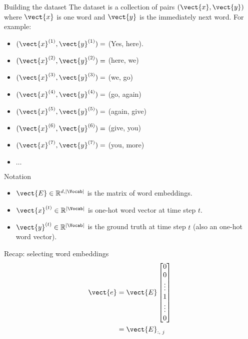 \documentclass[10pt]{beamer}
\begin{document}
\begin{frame}{Building the dataset}
The dataset is a collection of pairs $(\vect{x},\vect{y})$ where $\vect{x}$ is one word and $\vect{y}$ is the immediately next word. For example:
\begin{itemize}
\item [] $(\vect{x}^{(1)}, \vect{y}^{(1)}) =$ (Yes, here).
\item [] $(\vect{x}^{(2)}, \vect{y}^{(2)}) =$ (here, we)
\item [] $(\vect{x}^{(3)}, \vect{y}^{(3)}) =$ (we, go)
\item [] $(\vect{x}^{(4)}, \vect{y}^{(4)}) =$ (go, again)
\item [] $(\vect{x}^{(5)}, \vect{y}^{(5)}) =$ (again, give)
\item [] $(\vect{x}^{(6)}, \vect{y}^{(6)}) =$ (give, you)
\item [] $(\vect{x}^{(7)}, \vect{y}^{(7)}) =$ (you, more)
\item [] $\dots$
\end{itemize}
\end{frame}

\begin{frame}{Notation}
\begin{itemize}
\item $\vect{E} \in \mathbb{R}^{d,|\Vocab|}$ is the matrix of word embeddings.
\vspace{0.3cm}
\item $\vect{x}^{(t)} \in \mathbb{R}^{|\Vocab|}$ is one-hot word vector at time step $t$.
\vspace{0.3cm}
\item $\vect{y}^{(t)} \in \mathbb{R}^{|\Vocab|}$ is the ground truth at time step $t$ (also an one-hot word vector).
\end{itemize}
\end{frame}

\begin{frame}{Recap: selecting word embeddings}
\Large{
\begin{align*}
  \vect{e} &= \vect{E}   \begin{bmatrix}
                         0\\
                         0\\
                         \vdots \\
                         1\\
                         \vdots \\
                         0
                         \end{bmatrix}\\         
      &= \vect{E}_{:,\;j}
\end{align*}
 }
\end{frame}
\end{document}
